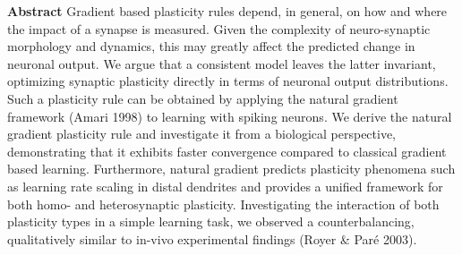 \documentclass[12pt]{article}
\begin{document}
{\bf Abstract}
Gradient based plasticity rules depend, in general, on how and where the impact of a synapse is measured. Given the complexity of neuro-synaptic morphology and dynamics, this may greatly affect the predicted change in neuronal output. We argue that a consistent model leaves the latter invariant, optimizing synaptic plasticity directly in terms of neuronal output distributions. Such a plasticity rule can be obtained by applying the natural gradient framework (Amari 1998) to learning with spiking neurons. We derive the natural gradient plasticity rule and investigate it from a biological perspective, demonstrating that it exhibits faster convergence compared to classical gradient based learning. Furthermore, natural gradient predicts plasticity phenomena such as learning rate scaling in distal dendrites and provides a unified framework for both homo- and heterosynaptic plasticity. Investigating the interaction of both plasticity types in a simple learning task, we observed a counterbalancing, qualitatively similar to in-vivo experimental findings (Royer \& Paré 2003).
\end{document}
